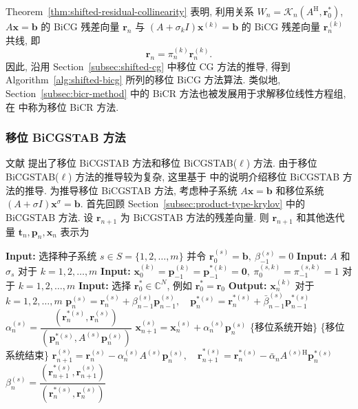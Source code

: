 {Theorem\ \ref{thm:shifted-residual-collinearity} 表明, 利用关系 $W_n=\mathcal K_n(A^{\mathrm H},\bm r_0^*)$, $A\bm x=\bm b$ 的 BiCG 残差向量 $\bm r_n$ 与 $(A+\sigma_k I)\bm x^{(k)}=\bm b$ 的 BiCG 残差向量 $\bm r_n^{(k)}$ 共线, 即}
\[\bm r_n=\pi_n^{(k)}\bm r_n^{(k)}.\]
{因此, 沿用 Section\ \ref{subsec:shifted-cg} 中移位 CG 方法的推导, 得到 Algorithm\ \ref{alg:shifted-bicg} 所列的移位 BiCG 方法算法. 类似地, Section\ \ref{subsec:bicr-method} 中的 BiCR 方法也被发展用于求解移位线性方程组, 在  中称为移位 BiCR 方法.}
\subsubsection{{移位 BiCGSTAB 方法}}\label{subsec:shifted-bicgstab}
{文献  提出了移位 BiCGSTAB 方法和移位 BiCGSTAB($\ell$) 方法. \newline{}由于移位 BiCGSTAB($\ell$) 方法的推导较为复杂, 这里基于  中的说明介绍移位 BiCGSTAB 方法的推导. 为推导移位 BiCGSTAB 方法, 考虑种子系统 $A\bm x=\bm b$ 和移位系统 $(A+\sigma I)\bm x^{\sigma}=\bm b$. 首先回顾 Section\ \ref{subsec:product-type-krylov} 中的 BiCGSTAB 方法. 设 $\bm r_{n+1}$ 为 BiCGSTAB 方法的残差向量. 则 $\bm r_{n+1}$ 和其他迭代量 $\bm t_n,\bm p_n,\bm x_n$ 表示为}
\begin{algorithm}[H]\caption{{移位 BiCG 方法}}\label{alg:shifted-bicg}\begin{algorithmic}[1]
\Statex\textbf{Input:} {选择种子系统 $s\in S=\{1,2,\ldots,m\}$ 并令 $\bm r_0^{(s)}=\bm b,\ \beta_{-1}^{(s)}=0$}
\Statex\textbf{Input:} $A$ {和} $\sigma_s$ {对于} $k=1,2,\ldots,m$
\Statex\textbf{Input:} $\bm x_0^{(k)}=\bm p_{-1}^{(k)}=\bm p_{-1}^{*(k)}=\bm0,\ \pi_0^{(s,k)}=\pi_{-1}^{(s,k)}=1$ {对于} $k=1,2,\ldots,m$
\Statex\textbf{Input:} {选择 $\bm r_0^*\in\mathbb C^N$, 例如 $\bm r_0^*=\bm r_0$}
\Statex\textbf{Output:} $\bm x_n^{(k)}$ {对于} $k=1,2,\ldots,m$
\State $\bm p_n^{(s)}=\bm r_n^{(s)}+\beta_{n-1}^{(s)}\bm p_{n-1}^{(s)},\quad\bm p_n^{*(s)}=\bm r_n^{*(s)}+\bar\beta_{n-1}^{(s)}\bm p_{n-1}^{*(s)}$
\State $\alpha_n^{(s)}=\dfrac{(\bm r_n^{*(s)},\bm r_n^{(s)})}{(\bm p_n^{*(s)},A^{(s)}\bm p_n^{(s)})}$
\State $\bm x_{n+1}^{(s)}=\bm x_n^{(s)}+\alpha_n^{(s)}\bm p_n^{(s)}$
\State \{{移位系统开始}\}
\State \{{移位系统结束}\}
\State $\bm r_{n+1}^{(s)}=\bm r_n^{(s)}-\alpha_n^{(s)}A^{(s)}\bm p_n^{(s)},\quad\bm r_{n+1}^{*(s)}=\bm r_n^{*(s)}-\bar\alpha_nA^{(s)\mathrm H}\bm p_n^{*(s)}$
\State $\beta_n^{(s)}=\dfrac{(\bm r_{n+1}^{*(s)},\bm r_{n+1}^{(s)})}{(\bm r_n^{*(s)},\bm r_n^{(s)})}$
\EndFor\end{algorithmic}\end{algorithm}
